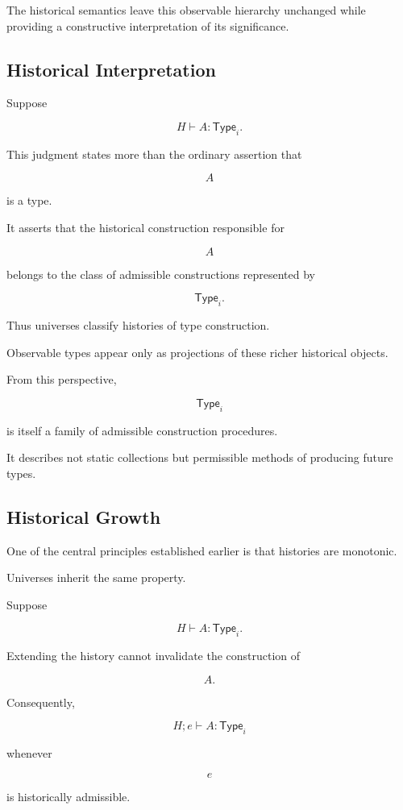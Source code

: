 \documentclass[12pt,oneside]{article}
\theoremstyle{definition}
\theoremstyle{remark}
\newcommand{\Type}{\mathsf{Type}}
\begin{document}
The historical semantics leave this observable hierarchy unchanged while
providing a constructive interpretation of its significance.

\subsection{Historical Interpretation}

Suppose

\[
H
\vdash
A
:
\Type_i.
\]

This judgment states more than the ordinary assertion that

\[
A
\]

is a type.

It asserts that the historical construction responsible for

\[
A
\]

belongs to the class of admissible constructions represented by

\[
\Type_i.
\]

Thus universes classify histories of type construction.

Observable types appear only as projections of these richer historical objects.

From this perspective,

\[
\Type_i
\]

is itself a family of admissible construction procedures.

It describes not static collections but permissible methods of producing future
types.

\subsection{Historical Growth}

One of the central principles established earlier is that histories are
monotonic.

Universes inherit the same property.

Suppose

\[
H
\vdash
A
:
\Type_i.
\]

Extending the history cannot invalidate the construction of

\[
A.
\]

Consequently,

\[
H;e
\vdash
A
:
\Type_i
\]

whenever

\[
e
\]

is historically admissible.
\end{document}
